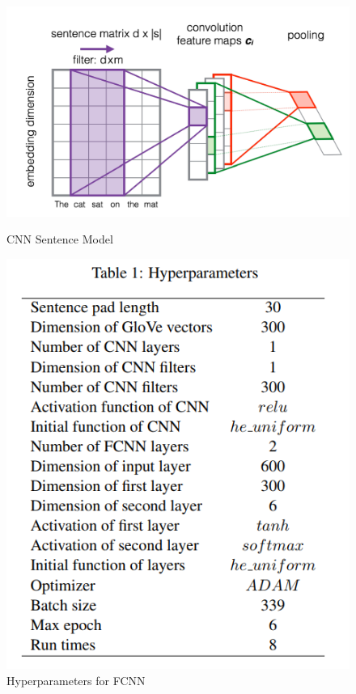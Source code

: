\documentclass[12pt]{report} %
\begin{document}
	\begin{figure}[!tbp]
		\centering
		\begin{minipage}[b]{0.43\textwidth}
		\centering
		\label{CNN_1}
		\includegraphics[scale=0.20]{image/CNN_sentModel.png}
		\caption{CNN Sentence Model \cite{severyn2015learning}}
		\end{minipage}
		\hfill
		\begin{minipage}[b]{0.3\textwidth}
		\centering
		\caption{Hyperparameters for FCNN \cite{shao2017hcti}}
		\label{params}
		
		\includegraphics[scale=0.35]{image/hyperparameters.png}
		
		\end{minipage}
	\end{figure}
	
\end{document}
